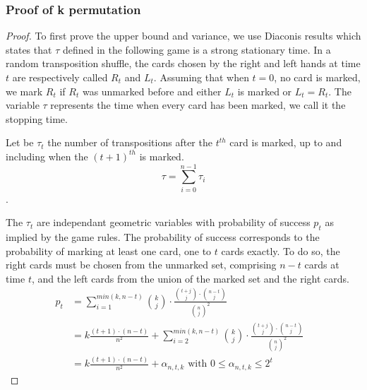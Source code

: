 \documentclass[a4paper]{article}
\begin{document}
\subsubsection{Proof of k permutation}
\begin{proof}
To first prove the upper bound and variance, we use Diaconis\cite{} results which states that $\tau$ defined in the following game is a strong stationary time.
In a random transposition shuffle, the cards chosen by the right and left hands at time $t$ are respectively called $R_t$ and $L_t$. Assuming that when $t=0$, no card is marked, we mark $R_t$ if
$R_t$ was unmarked before and either $L_t$ is marked or $L_t = R_t$. The variable $\tau$ represents the time when every card has been marked, we call it the stopping time.

Let be $\tau_t$ the number of transpositions after the $t^{th}$ card is marked, up to and including when the $(t+1)^{th}$ is marked.
$$\tau = \sum_{i=0}^{n-1} \tau_i$$.

The $\tau_t$ are independant geometric variables with probability of success $p_t$ as implied by the game rules.
The probability of success corresponds to the probability of marking at least one card, one to $t$ cards exactly. To do so, the right cards must be chosen from the unmarked set, comprising $n-t$ cards at time $t$,
and the left cards from the union of the marked set and the right cards.
\begin{align*}
 p_t &= \sum_{i=1}^{min(k,n-t)} {k \choose j} \cdot \frac{ {t+j \choose j} \cdot {n-t \choose j} }{ {n \choose j}^2 }&\\
 &= k \frac{(t+1)\cdot(n-t)}{n^2} + \sum_{i=2}^{min(k,n-t)} {k \choose j} \cdot \frac{ {t+j \choose j} \cdot {n-t \choose j} }{ {n \choose j}^2 }&\\
 &= k \frac{(t+1)\cdot(n-t)}{n^2} + \alpha_{n,t,k} \text{ with } 0 \leq \alpha_{n,t,k} \leq 2^t
\end{align*}


\end{proof}
\end{document}
